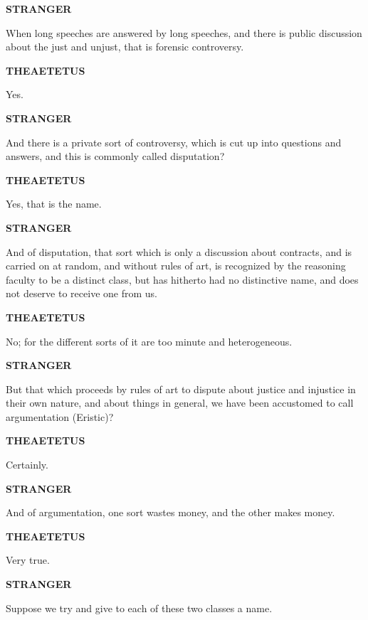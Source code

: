 \documentclass[11pt,letter]{article}
\begin{document}
\par \textbf{STRANGER}
\par   When long speeches are answered by long speeches, and there is public discussion about the just and unjust, that is forensic controversy.

\par \textbf{THEAETETUS}
\par   Yes.

\par \textbf{STRANGER}
\par   And there is a private sort of controversy, which is cut up into questions and answers, and this is commonly called disputation?

\par \textbf{THEAETETUS}
\par   Yes, that is the name.

\par \textbf{STRANGER}
\par   And of disputation, that sort which is only a discussion about contracts, and is carried on at random, and without rules of art, is recognized by the reasoning faculty to be a distinct class, but has hitherto had no distinctive name, and does not deserve to receive one from us.

\par \textbf{THEAETETUS}
\par   No; for the different sorts of it are too minute and heterogeneous.

\par \textbf{STRANGER}
\par   But that which proceeds by rules of art to dispute about justice and injustice in their own nature, and about things in general, we have been accustomed to call argumentation (Eristic)?

\par \textbf{THEAETETUS}
\par   Certainly.

\par \textbf{STRANGER}
\par   And of argumentation, one sort wastes money, and the other makes money.

\par \textbf{THEAETETUS}
\par   Very true.

\par \textbf{STRANGER}
\par   Suppose we try and give to each of these two classes a name.
\end{document}

